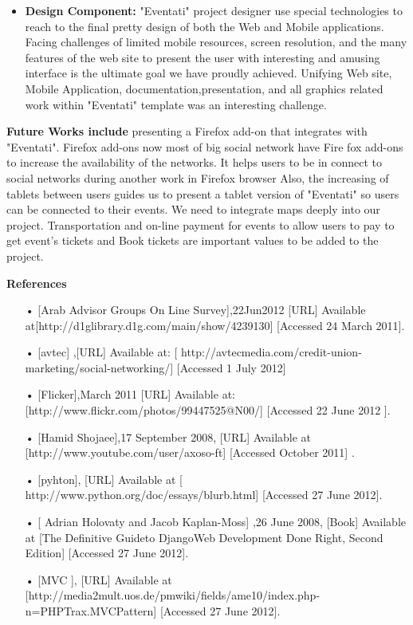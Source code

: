 \documentclass[12pt,a4paper,class,twoside,openany]{report}
\begin{document}
{\begin{itemize}
\newpage
\item \textbf{Design Component:}
"Eventati" project designer use special technologies to reach to the final pretty design of both the Web and Mobile applications. Facing challenges of limited mobile resources, screen resolution, and the many features of the web site to present the user with interesting and amusing interface is the ultimate goal we have proudly achieved. Unifying Web site, Mobile Application, documentation,presentation, and all graphics related work within "Eventati" template was an interesting challenge.
\end{itemize}
\textbf{Future Works include }
presenting a Firefox add-on that integrates with "Eventati". Firefox add-ons now most of big social network have Fire fox add-ons to increase the availability of the networks. It helps users to be in connect to social networks during another work in Firefox browser
Also, the increasing of tablets between users guides us to present a tablet version of "Eventati" so users can be connected to their events.
We need to integrate maps deeply into our project. Transportation and on-line payment for events to allow users to pay to get event's tickets and Book tickets are important values to be added to the project.
\newpage
\begin{flushleft}
\textbf{References}
\end{flushleft}
\begin{itemize}
\item[•] [Arab Advisor Groups On Line Survey],22Jun2012 [URL] Available at[http://d1glibrary.d1g.com/main/show/4239130] [Accessed 24 March 2011].
\item[•] [avtec] ,[URL] Available at:
 [ http://avtecmedia.com/credit-union-marketing/social-networking/]
  [Accessed 1 July 2012]
\item[•] [Flicker],March 2011 [URL] Available at:
 [http://www.flickr.com/photos/99447525@N00/] [Accessed  22 June 2012 ].
\item[•] [Hamid Shojaee],17 September 2008,  [URL] Available at 
  [http://www.youtube.com/user/axoso-ft] [Accessed October 2011] . 
\item[•] [pyhton], [URL] Available at [ http://www.python.org/doc/essays/blurb.html] 
  [Accessed 27 June 2012]. 
 \item[•] [ Adrian Holovaty and Jacob Kaplan-Moss] ,26 June 2008, [Book] Available at [The Definitive Guideto DjangoWeb Development Done Right, Second Edition] [Accessed 27 June 2012].  
 \item[•] [MVC ], [URL] Available at [http://media2mult.uos.de/pmwiki/fields/ame10/index.php-n=PHPTrax.MVCPattern] [Accessed 27 June 2012]. 

\end{itemize}}
\end{document}
